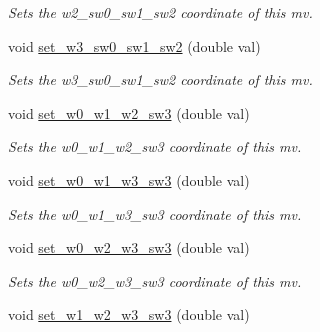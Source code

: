 \begin{DoxyCompactItemize}
\begin{DoxyCompactList}\small\item\em Sets the w2\-\_\-sw0\-\_\-sw1\-\_\-sw2 coordinate of this mv. \end{DoxyCompactList}\item 
\hypertarget{classe3ga_1_1mv_af4b1d4aed2afd8e763f4717decca9f9a}{void \hyperlink{classe3ga_1_1mv_af4b1d4aed2afd8e763f4717decca9f9a}{set\-\_\-w3\-\_\-sw0\-\_\-sw1\-\_\-sw2} (double val)}\label{classe3ga_1_1mv_af4b1d4aed2afd8e763f4717decca9f9a}

\begin{DoxyCompactList}\small\item\em Sets the w3\-\_\-sw0\-\_\-sw1\-\_\-sw2 coordinate of this mv. \end{DoxyCompactList}\item 
\hypertarget{classe3ga_1_1mv_ad63633b3e8e486850f1431251444b5be}{void \hyperlink{classe3ga_1_1mv_ad63633b3e8e486850f1431251444b5be}{set\-\_\-w0\-\_\-w1\-\_\-w2\-\_\-sw3} (double val)}\label{classe3ga_1_1mv_ad63633b3e8e486850f1431251444b5be}

\begin{DoxyCompactList}\small\item\em Sets the w0\-\_\-w1\-\_\-w2\-\_\-sw3 coordinate of this mv. \end{DoxyCompactList}\item 
\hypertarget{classe3ga_1_1mv_ae296c114026e95865636458378221598}{void \hyperlink{classe3ga_1_1mv_ae296c114026e95865636458378221598}{set\-\_\-w0\-\_\-w1\-\_\-w3\-\_\-sw3} (double val)}\label{classe3ga_1_1mv_ae296c114026e95865636458378221598}

\begin{DoxyCompactList}\small\item\em Sets the w0\-\_\-w1\-\_\-w3\-\_\-sw3 coordinate of this mv. \end{DoxyCompactList}\item 
\hypertarget{classe3ga_1_1mv_ad911dad42524ea16fe118bb787d1bc98}{void \hyperlink{classe3ga_1_1mv_ad911dad42524ea16fe118bb787d1bc98}{set\-\_\-w0\-\_\-w2\-\_\-w3\-\_\-sw3} (double val)}\label{classe3ga_1_1mv_ad911dad42524ea16fe118bb787d1bc98}

\begin{DoxyCompactList}\small\item\em Sets the w0\-\_\-w2\-\_\-w3\-\_\-sw3 coordinate of this mv. \end{DoxyCompactList}\item 
\hypertarget{classe3ga_1_1mv_a8e66481694c66774a820dfbc6aad5eba}{void \hyperlink{classe3ga_1_1mv_a8e66481694c66774a820dfbc6aad5eba}{set\-\_\-w1\-\_\-w2\-\_\-w3\-\_\-sw3} (double val)}\label{classe3ga_1_1mv_a8e66481694c66774a820dfbc6aad5eba}


\end{DoxyCompactItemize}
